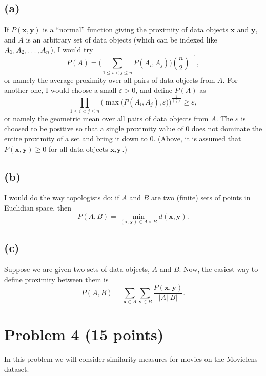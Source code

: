 \documentclass[10pt]{article}
\begin{document}
\color{black}
\subsection*{(a)}
If $P(\textbf{x}, \textbf{y})$ is a ``normal'' function giving the proximity of data objects $\textbf{x}$ and $\textbf{y}$, and $A$ is an arbitrary set of data objects (which can be indexed like $A_1, A_2, \dots,\\ A_n$), I would try 
\[
P(A) = \Bigg( \sum_{1 \leq i < j \leq n} P(A_i, A_j) \Bigg)\binom{n}{2}^{-1},
\]
or namely the average proximity over all pairs of data objects from $A$. For another one, I would choose a small $\varepsilon > 0$, and define $P(A)$ as
\[
\prod_{1 \leq i < j \leq n} \bigg( \max \big( P(A_i, A_j), \varepsilon \big) \bigg)^{ \frac{1}{\binom{n}{2}}} \geq \varepsilon,
\]
or namely the geometric mean over all pairs of data objects from $A$. The $\varepsilon$ is choosed to be positive so that a single proximity value of 0 does not dominate the entire proximity of a set and bring it down to 0. (Above, it is assumed that $P(\textbf{x}, \textbf{y}) \geq 0$ for all data objects $\textbf{x}, \textbf{y}$.)
 
\subsection*{(b)}
 I would do the way topologists do: if $A$ and $B$ are two (finite) sets of points in Euclidian space, then
 \[
 P(A, B) = \underset{(\textbf{x}, \textbf{y}) \in A \times B}{\min} d(\textbf{x}, \textbf{y}).
 \]
 
\subsection*{(c)}
Suppose we are given two sets of data objects, $A$ and $B$. Now, the easiest way to define proximity between them is
\[
P(A, B) = \sum_{\textbf{x} \in A} \sum_{\textbf{y} \in B} \frac{P(\textbf{x}, \textbf{y})}{|A||B|}.
\]  

\color{blue}
\section*{Problem 4 (15 points)}
In this problem we will consider similarity measures for movies on the Movielens dataset.
 \color{black}
 
\end{document}
